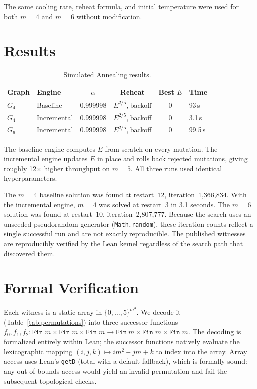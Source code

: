 \documentclass[11pt]{article}
\theoremstyle{plain}
\begin{document}
The same cooling rate, reheat formula, and initial temperature were used
for both $m=4$ and $m=6$ without modification.

\section{Results}

\begin{table}[h]
\centering
\caption{Simulated Annealing results.}
\label{tab:results}
\begin{tabular}{@{}llcccl@{}}
\toprule
Graph & Engine & $\alpha$ & Reheat & Best $E$ & Time \\
\midrule
$G_4$ & Baseline & 0.999998 & $E^{2/5}$, backoff & 0 & 93\,s \\
$G_4$ & Incremental & 0.999998 & $E^{2/5}$, backoff & 0 & 3.1\,s \\
$G_6$ & Incremental & 0.999998 & $E^{2/5}$, backoff & 0 & 99.5\,s \\
\bottomrule
\end{tabular}
\end{table}

The baseline engine computes $E$ from scratch on every mutation. The
incremental engine updates $E$ in place and rolls back rejected mutations,
giving roughly 12$\times$ higher throughput on $m=6$. All three runs used
identical hyperparameters.

The $m=4$ baseline solution was found at restart~12, iteration~1{,}366{,}834.
With the incremental engine, $m=4$ was solved at restart~3 in 3.1 seconds.
The $m=6$ solution was found at restart~10, iteration~2{,}807{,}777.
Because the search uses an unseeded pseudorandom generator
(\texttt{Math.random}), these iteration counts reflect a single
successful run and are not exactly reproducible. The published
witnesses are reproducibly verified by the Lean kernel regardless
of the search path that discovered them.

\section{Formal Verification}

Each witness is a static array in $\{0,\ldots,5\}^{m^3}$. We decode it
(Table~\ref{tab:permutations}) into three successor functions
$f_0, f_1, f_2 :
\texttt{Fin}\;m \times \texttt{Fin}\;m \times \texttt{Fin}\;m \to
\texttt{Fin}\;m \times \texttt{Fin}\;m \times \texttt{Fin}\;m$.
The decoding is formalized entirely within Lean; the successor
functions natively evaluate the lexicographic mapping
$(i,j,k) \mapsto im^2 + jm + k$ to index into the array.
Array access uses Lean's \texttt{getD} (total with a default
fallback), which is formally sound: any out-of-bounds access
would yield an invalid permutation and fail the subsequent
topological checks.
\end{document}
